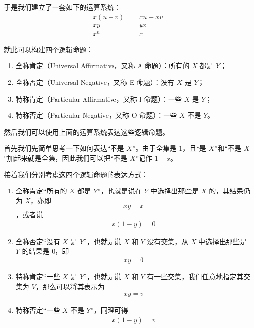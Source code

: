         于是我们建立了一套如下的运算系统：
        \begin{align}
            x(u + v) &= xu + xv \label{eqn:Calculations/BooleanAlgebra/OriginAndBuilding/DistributiveLaw} \\
            xy &= yx \label{eqn:Calculations/BooleanAlgebra/OriginAndBuilding/CommutativeLaw} \\
            x ^ n &= x \label{eqn:Calculations/BooleanAlgebra/OriginAndBuilding/IndexLaw}
        \end{align}

        就此可以构建四个逻辑命题：
        \begin{enumerate}
            \item 全称肯定（Universal Affirmative，又称 A 命题）：所有的 $X$ 都是 $Y$；
            \item 全称否定（Universal Negative，又称 E 命题）：没有 $X$ 是 $Y$；
            \item 特称肯定（Particular Affirmative，又称 I 命题）：一些 $X$ 是 $Y$；
            \item 特称否定（Particular Negative，又称 O 命题）：一些 $X$ 不是 $Y$。
        \end{enumerate}
        然后我们可以使用上面的运算系统表达这些逻辑命题。

        首先我们先简单思考一下如何表达“不是 $X$”。由于全集是 $1$，且“是 $X$”和“不是 $X$”加起来就是全集，因此我们可以把“不是 $X$”记作 $1 - x$。

        接着我们分别考虑这四个逻辑命题的表达方式：
        \begin{enumerate}
            \item 全称肯定“所有的 $X$ 都是 $Y$”，也就是说在 $Y$ 中选择出那些是 $X$ 的，其结果仍为 $X$，亦即 \[xy = x\]，或者说
                \begin{align}
                    x(1 - y) = 0 \label{eqn:Calculations/BooleanAlgebra/OriginAndBuilding/UniversalAffirmative}
                \end{align}
            \item 全称否定“没有 $X$ 是 $Y$”，也就是说 $X$ 和 $Y$ 没有交集，从 $X$ 中选择出那些是 $Y$ 的结果是 $0$，即
                \begin{align}
                    xy = 0 \label{eqn:Calculations/BooleanAlgebra/OriginAndBuilding/UniversalNegative}
                \end{align}
            \item 特称肯定“一些 $X$ 是 $Y$”，也就是说 $X$ 和 $Y$ 有一些交集，我们任意地指定其交集为 $V$，那么可以将其表示为
                \begin{align}
                    xy = v \label{eqn:Calculations/BooleanAlgebra/OriginAndBuilding/ParticularAffirmative}
                \end{align}
            \item 特称否定“一些 $X$ 不是 $Y$”，同理可得
                \begin{align}
                    x(1 - y) = v \label{eqn:Calculations/BooleanAlgebra/OriginAndBuilding/ParticularNegative}
                \end{align}
        \end{enumerate}


